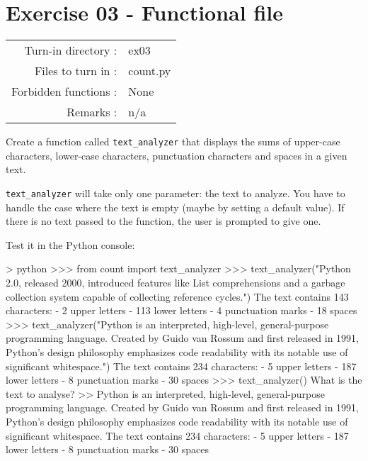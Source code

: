 \documentclass[]{article}
\newenvironment{Shaded}{\begin{snugshade}}{\end{snugshade}}
\newcommand{\NormalTok}[1]{\textcolor[rgb]{0.81,0.81,0.76}{#1}}
\begin{document}
\clearpage

\hypertarget{exercise-03---functional-file-1}{%
\section{Exercise 03 - Functional
file}\label{exercise-03---functional-file-1}}

\begin{longtable}[]{@{}rl@{}}
\toprule
\endhead
Turn-in directory : & ex03\tabularnewline
Files to turn in : & count.py\tabularnewline
Forbidden functions : & None\tabularnewline
Remarks : & n/a\tabularnewline
\bottomrule
\end{longtable}

Create a function called \texttt{text\_analyzer} that displays the sums
of upper-case characters, lower-case characters, punctuation characters
and spaces in a given text.

\texttt{text\_analyzer} will take only one parameter: the text to
analyze. You have to handle the case where the text is empty (maybe by
setting a default value). If there is no text passed to the function,
the user is prompted to give one.

Test it in the Python console:

\begin{Shaded}
\begin{Highlighting}[]
\NormalTok{> python}
\NormalTok{>>> from count import text_analyzer}
\NormalTok{>>> text_analyzer("Python 2.0, released 2000, introduced }
\NormalTok{features like List comprehensions and a garbage collection}
\NormalTok{system capable of collecting reference cycles.")}
\NormalTok{The text contains 143 characters:}
\NormalTok{- 2 upper letters}
\NormalTok{- 113 lower letters}
\NormalTok{- 4 punctuation marks}
\NormalTok{- 18 spaces}
\NormalTok{>>> text_analyzer("Python is an interpreted, high-level,}
\NormalTok{general-purpose programming language. Created by Guido van}
\NormalTok{Rossum and first released in 1991, Python's design philosophy}
\NormalTok{emphasizes code readability with its notable use of significant}
\NormalTok{whitespace.")}
\NormalTok{The text contains 234 characters:}
\NormalTok{- 5 upper letters}
\NormalTok{- 187 lower letters}
\NormalTok{- 8 punctuation marks}
\NormalTok{- 30 spaces}
\NormalTok{>>> text_analyzer()}
\NormalTok{What is the text to analyse?}
\NormalTok{>> Python is an interpreted, high-level, general-purpose}
\NormalTok{programming language. Created by Guido van Rossum and first}
\NormalTok{released in 1991, Python's design philosophy emphasizes code}
\NormalTok{readability with its notable use of significant whitespace.}
\NormalTok{The text contains 234 characters:}
\NormalTok{- 5 upper letters}
\NormalTok{- 187 lower letters}
\NormalTok{- 8 punctuation marks}
\NormalTok{- 30 spaces}
\end{Highlighting}
\end{Shaded}
\end{document}
